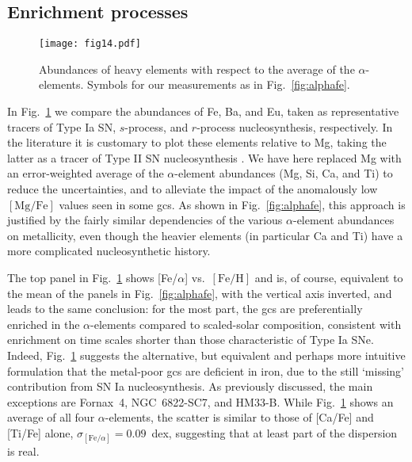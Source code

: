 \documentclass{aa}
\begin{document}
\subsection{Enrichment processes}

\begin{figure}
\centering
\texttt{[image: fig14.pdf]}
\caption{\label{fig:heavy2}Abundances of heavy elements with respect to the average of the $\alpha$-elements. Symbols for our measurements as in Fig.~\ref{fig:alphafe}.}
\end{figure}

In Fig.~\ref{fig:heavy2} we compare the abundances of Fe, Ba, and Eu, taken as representative tracers of Type Ia SN, $s$-process, and $r$-process nucleosynthesis, respectively. In the literature it is customary to plot these elements relative to Mg, taking the latter as a tracer of Type II SN nucleosynthesis \citep[e.g.][]{Skuladottir2020}. We have here replaced Mg with an error-weighted average of the $\alpha$-element abundances (Mg, Si, Ca, and Ti) to reduce the uncertainties, and to alleviate the impact of the anomalously low $\mathrm{[Mg/Fe]}$ values seen in some \acp{gc}. As shown in Fig.~\ref{fig:alphafe}, this approach is justified by the fairly similar dependencies of the various $\alpha$-element abundances on metallicity, even though the heavier elements (in particular Ca and Ti) have a more complicated nucleosynthetic history. 

The top panel in Fig.~\ref{fig:heavy2} shows [Fe/$\alpha$] vs.\ $\mathrm{[Fe/H]}$ and is, of course, equivalent to the mean of the panels in Fig.~\ref{fig:alphafe}, with the vertical axis inverted, and leads to the same conclusion: for the most part, the \acp{gc} are preferentially enriched in the $\alpha$-elements compared to scaled-solar composition, consistent with enrichment on time scales shorter than those characteristic of Type Ia SNe. Indeed, Fig.~\ref{fig:heavy2} suggests the alternative, but equivalent and perhaps more intuitive formulation that the metal-poor \acp{gc} are deficient in iron, due to the still `missing' contribution from SN Ia nucleosynthesis. 
As previously discussed, the main exceptions are Fornax~4, NGC~6822-SC7, and HM33-B. While Fig.~\ref{fig:heavy2} shows an average of all four $\alpha$-elements, the scatter is similar to those of [Ca/Fe] and [Ti/Fe] alone, $\sigma_{[\mathrm{Fe}/\alpha]} = 0.09$~dex, suggesting that at least part of the dispersion is real. 
\end{document}
